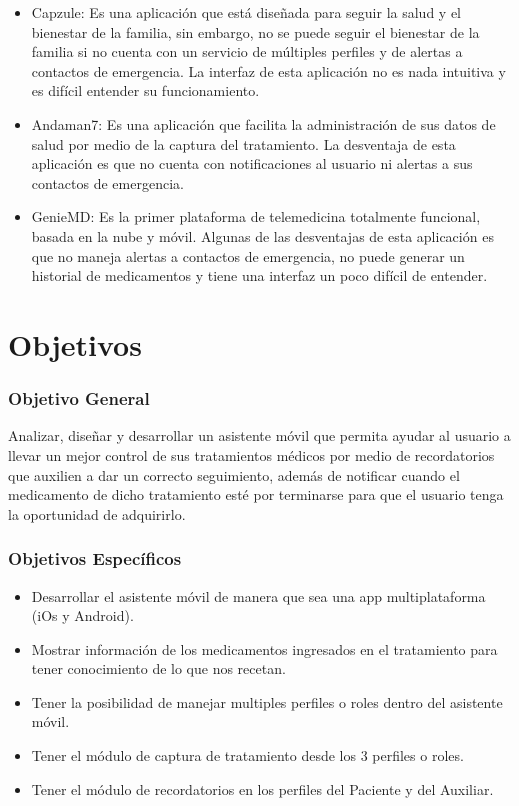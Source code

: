 \begin{itemize}
	\item Capzule: Es una aplicación que está diseñada para seguir la salud y el bienestar de la familia, sin embargo, no se puede seguir el bienestar de la familia si no cuenta con un servicio de múltiples perfiles y de alertas a contactos de emergencia. La interfaz de esta aplicación no es nada intuitiva y es difícil entender su funcionamiento.

	\item Andaman7: Es una aplicación que facilita la administración de sus datos de salud por medio de la captura del tratamiento. La desventaja de esta aplicación es que no cuenta con notificaciones al usuario ni alertas a sus contactos de emergencia. 
	
	\item GenieMD: Es la primer plataforma de telemedicina totalmente funcional, basada en la nube y móvil. Algunas de las desventajas de esta aplicación es que no maneja alertas a contactos de emergencia, no puede generar un historial de medicamentos y tiene una interfaz un poco difícil de entender.
	
\end{itemize}

\section{Objetivos}

\subsubsection{Objetivo General}
Analizar, diseñar y desarrollar un asistente móvil que permita ayudar al usuario a llevar un mejor control de sus tratamientos médicos por medio de recordatorios que auxilien a dar un correcto seguimiento, además de notificar cuando el medicamento de dicho tratamiento esté por terminarse para que el usuario tenga la oportunidad de adquirirlo.

\subsubsection{Objetivos Específicos}

\begin{itemize}
	
	\item Desarrollar el asistente móvil de manera que sea una app multiplataforma (iOs y Android).
	
	\item Mostrar información de los medicamentos ingresados en el tratamiento para tener conocimiento de lo que nos recetan. 
	
	\item Tener la posibilidad de manejar multiples perfiles o roles dentro del asistente móvil.
	
	\item Tener el módulo de captura de tratamiento desde los 3 perfiles o roles.
	
	\item Tener el módulo de recordatorios en los perfiles del Paciente y del Auxiliar.
	
\end{itemize}

